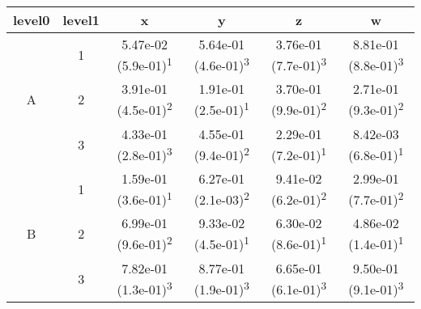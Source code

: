\begin{tabular}{cccccc}
\toprule
level0 & level1&x&y&z&w\tabularnewline
\midrule
\multirow{3}{*}{A}&1& 5.47e-02 (5.9e-01)\textsuperscript{1}& 5.64e-01 (4.6e-01)\textsuperscript{3}& 3.76e-01 (7.7e-01)\textsuperscript{3}& 8.81e-01 (8.8e-01)\textsuperscript{3}\tabularnewline
&2& 3.91e-01 (4.5e-01)\textsuperscript{2}& 1.91e-01 (2.5e-01)\textsuperscript{1}& 3.70e-01 (9.9e-01)\textsuperscript{2}& 2.71e-01 (9.3e-01)\textsuperscript{2}\tabularnewline
&3& 4.33e-01 (2.8e-01)\textsuperscript{3}& 4.55e-01 (9.4e-01)\textsuperscript{2}& 2.29e-01 (7.2e-01)\textsuperscript{1}& 8.42e-03 (6.8e-01)\textsuperscript{1}\tabularnewline
\midrule
\multirow{3}{*}{B}&1& 1.59e-01 (3.6e-01)\textsuperscript{1}& 6.27e-01 (2.1e-03)\textsuperscript{2}& 9.41e-02 (6.2e-01)\textsuperscript{2}& 2.99e-01 (7.7e-01)\textsuperscript{2}\tabularnewline
&2& 6.99e-01 (9.6e-01)\textsuperscript{2}& 9.33e-02 (4.5e-01)\textsuperscript{1}& 6.30e-02 (8.6e-01)\textsuperscript{1}& 4.86e-02 (1.4e-01)\textsuperscript{1}\tabularnewline
&3& 7.82e-01 (1.3e-01)\textsuperscript{3}& 8.77e-01 (1.9e-01)\textsuperscript{3}& 6.65e-01 (6.1e-01)\textsuperscript{3}& 9.50e-01 (9.1e-01)\textsuperscript{3}\tabularnewline
\bottomrule
\end{tabular}
